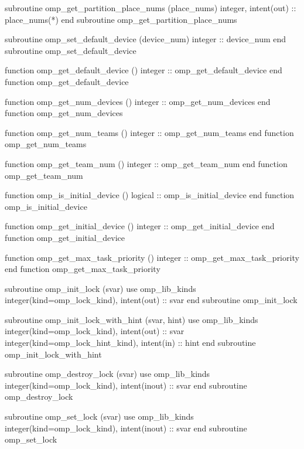{{\begin{codepar}
          subroutine omp\_get\_partition\_place\_nums (place\_nums)
          integer, intent(out) :: place\_nums(*)
          end subroutine omp\_get\_partition\_place\_nums

          subroutine omp\_set\_default\_device (device\_num)
           integer :: device\_num
          end subroutine omp\_set\_default\_device

          function omp\_get\_default\_device ()
           integer :: omp\_get\_default\_device
          end function omp\_get\_default\_device

          function omp\_get\_num\_devices ()
           integer :: omp\_get\_num\_devices
          end function omp\_get\_num\_devices

          function omp\_get\_num\_teams ()
           integer :: omp\_get\_num\_teams
          end function omp\_get\_num\_teams

          function omp\_get\_team\_num ()
           integer :: omp\_get\_team\_num
          end function omp\_get\_team\_num

          function omp\_is\_initial\_device ()
           logical :: omp\_is\_initial\_device
          end function omp\_is\_initial\_device

          function omp\_get\_initial\_device ()
           integer :: omp\_get\_initial\_device
          end function omp\_get\_initial\_device

          function omp\_get\_max\_task\_priority ()
           integer :: omp\_get\_max\_task\_priority
          end function omp\_get\_max\_task\_priority

          subroutine omp\_init\_lock (svar)
           use omp\_lib\_kinds
           integer(kind=omp\_lock\_kind), intent(out) :: svar
          end subroutine omp\_init\_lock

          subroutine omp\_init\_lock\_with\_hint (svar, hint)
           use omp\_lib\_kinds
           integer(kind=omp\_lock\_kind), intent(out) :: svar
           integer(kind=omp\_lock\_hint\_kind), intent(in) :: hint
          end subroutine omp\_init\_lock\_with\_hint

          subroutine omp\_destroy\_lock (svar)
           use omp\_lib\_kinds
           integer(kind=omp\_lock\_kind), intent(inout) :: svar
          end subroutine omp\_destroy\_lock

          subroutine omp\_set\_lock (svar)
           use omp\_lib\_kinds
           integer(kind=omp\_lock\_kind), intent(inout) :: svar
          end subroutine omp\_set\_lock


\end{codepar}}}
